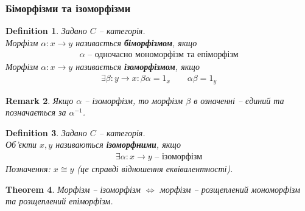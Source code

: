\documentclass[a4paper, 10pt]{article}
\theoremstyle{theoremdd}
\newtheorem{theorem}{Theorem}[subsection]
\newtheorem{definition}[theorem]{Definition}
\newtheorem{remark}[theorem]{Remark}
\begin{document}
\subsubsection{Біморфізми та ізоморфізми}
\begin{definition}
Задано $C$ -- категорія.\\
Морфізм $\alpha \colon x \to y$ називається \textbf{біморфізмом}, якщо
\begin{align*}
\alpha \text{ -- одночасно мономорфізм та епіморфізм}
\end{align*}
Морфізм $\alpha \colon x \to y$ називається \textbf{ізоморфізмом}, якщо
\begin{align*}
\exists \beta \colon y \to x: \beta \alpha = 1_x \qquad \alpha \beta = 1_y
\end{align*}
\end{definition}

\begin{remark}
Якщо $\alpha$ -- ізоморфізм, то морфізм $\beta$ в означенні -- єдиний та позначається за $\alpha^{-1}$.
\end{remark}

\begin{definition}
Задано $C$ -- категорія.\\
Об'єкти $x,y$ називаються \textbf{ізоморфними}, якщо
\begin{align*}
\exists \alpha \colon x \to y \text{ -- ізоморфізм}
\end{align*}
Позначення: $x \cong y$ (це справді відношення еквівалентності).
\end{definition}

\begin{theorem}
Морфізм -- ізоморфізм $\iff$ морфізм -- розщеплений мономорфізм та розщеплений епіморфізм.
\end{theorem}
\end{document}
